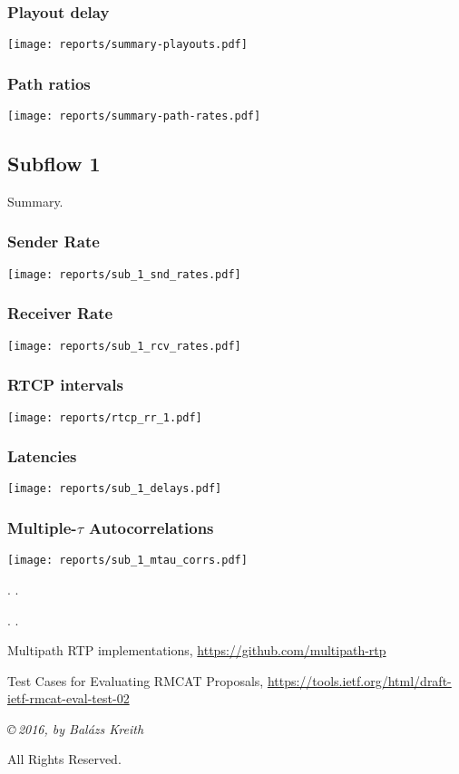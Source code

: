 \documentclass[a4paper]{article}
\begin{document}
\subsubsection{Playout delay}
\texttt{[image: reports/summary-playouts.pdf]}

\subsubsection{Path ratios}
\texttt{[image: reports/summary-path-rates.pdf]}



\subsection{Subflow 1}
Summary.

\subsubsection{Sender Rate}
\texttt{[image: reports/sub\_1\_snd\_rates.pdf]}

\subsubsection{Receiver Rate}
\texttt{[image: reports/sub\_1\_rcv\_rates.pdf]}

\subsubsection{RTCP intervals}
\texttt{[image: reports/rtcp\_rr\_1.pdf]}

\subsubsection{Latencies}
\texttt{[image: reports/sub\_1\_delays.pdf]}

\subsubsection{Multiple-$\tau$ Autocorrelations}
\texttt{[image: reports/sub\_1\_mtau\_corrs.pdf]}



.
.



.
.


\begin{thebibliography}{9}
Multipath RTP implementations, \url{https://github.com/multipath-rtp}

Test Cases for Evaluating RMCAT Proposals, \url{https://tools.ietf.org/html/draft-ietf-rmcat-eval-test-02}

\end{thebibliography}

{%
   \vspace*{65mm}
   \thispagestyle{empty}
   \footnotesize\itshape
   \setlength{\parskip}{\baselineskip}
   \setlength{\parindent}{0pt}
   \copyright\,2016, by Balázs Kreith

   All Rights Reserved.
}%
\end{document}
